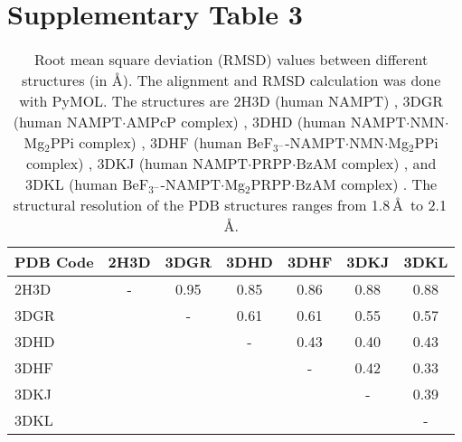 \documentclass[a4paper,10pt]{article}
\begin{document}
\setcounter{table}{2}
\begin{table}
\section*{Supplementary Table 3}
 \begin{tabular}{l|cccccc}
  \toprule
  PDB Code & 2H3D & 3DGR & 3DHD & 3DHF & 3DKJ & 3DKL \\ 
  \midrule
  2H3D & - & 0.95 & 0.85 & 0.86 & 0.88 & 0.88 \\
  3DGR &   &  -   & 0.61 & 0.61 & 0.55 & 0.57 \\
  3DHD &   &      &  -   & 0.43 & 0.40 & 0.43 \\
  3DHF &   &      &      &  -   & 0.42 & 0.33 \\
  3DKJ &   &      &      &      &  -   & 0.39 \\
  3DKL &   &      &      &      &      &  -   \\
 \bottomrule
 \end{tabular}
  \caption{Root mean square deviation (RMSD) values between different structures (in \AA). The alignment and RMSD calculation was done with PyMOL\cite{PyMOL}. The structures are 2H3D (human NAMPT) \cite{Wang2006}, 3DGR (human NAMPT$\cdot$AMPcP complex) \cite{Burgos2009}, 3DHD (human NAMPT$\cdot$NMN$\cdot$Mg$_2$PPi complex) \cite{Burgos2009}, 3DHF (human BeF$_{3^-}$-NAMPT$\cdot$NMN$\cdot$Mg$_2$PPi complex) \cite{Burgos2009}, 3DKJ (human NAMPT$\cdot$PRPP$\cdot$BzAM complex) \cite{Burgos2009}, and 3DKL (human BeF$_{3^-}$-NAMPT$\cdot$Mg$_2$PRPP$\cdot$BzAM complex) \cite{Burgos2009}. The structural resolution of the PDB structures ranges from 1.8\,\AA~to 2.1\,\AA.}
\end{table}






\end{document}

